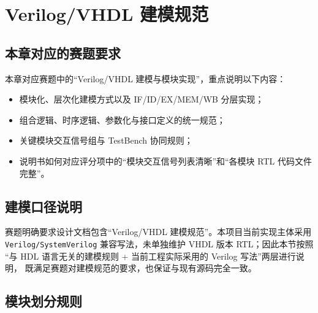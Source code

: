 \section{Verilog/VHDL 建模规范}

\subsection{本章对应的赛题要求}

本章对应赛题中的“Verilog/VHDL 建模与模块实现”，重点说明以下内容：
\begin{itemize}
    \item 模块化、层次化建模方式以及 IF/ID/EX/MEM/WB 分层实现；
    \item 组合逻辑、时序逻辑、参数化与接口定义的统一规范；
    \item 关键模块交互信号组与 TestBench 协同规则；
    \item 说明书如何对应评分项中的“模块交互信号列表清晰”和“各模块 RTL 代码文件完整”。
\end{itemize}

\subsection{建模口径说明}

赛题明确要求设计文档包含“Verilog/VHDL 建模规范”。本项目当前实现主体采用
\texttt{Verilog/SystemVerilog} 兼容写法，未单独维护 VHDL 版本 RTL；因此本节按照
“与 HDL 语言无关的建模规则 + 当前工程实际采用的 Verilog 写法”两层进行说明，
既满足赛题对建模规范的要求，也保证与现有源码完全一致。

\subsection{模块划分规则}

